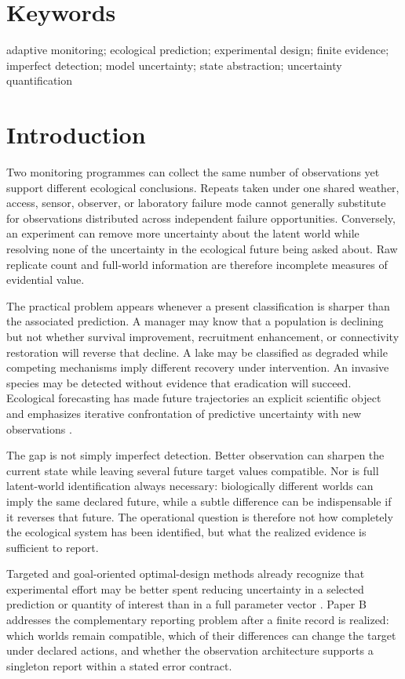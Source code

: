 \documentclass[11pt]{article}
\begin{document}
\section*{Keywords}
adaptive monitoring; ecological prediction; experimental design; finite evidence; imperfect detection; model uncertainty; state abstraction; uncertainty quantification

\section{Introduction}
Two monitoring programmes can collect the same number of observations yet support different ecological conclusions. Repeats taken under one shared weather, access, sensor, observer, or laboratory failure mode cannot generally substitute for observations distributed across independent failure opportunities. Conversely, an experiment can remove more uncertainty about the latent world while resolving none of the uncertainty in the ecological future being asked about. Raw replicate count and full-world information are therefore incomplete measures of evidential value.

The practical problem appears whenever a present classification is sharper than the associated prediction. A manager may know that a population is declining but not whether survival improvement, recruitment enhancement, or connectivity restoration will reverse that decline. A lake may be classified as degraded while competing mechanisms imply different recovery under intervention. An invasive species may be detected without evidence that eradication will succeed. Ecological forecasting has made future trajectories an explicit scientific object and emphasizes iterative confrontation of predictive uncertainty with new observations \cite{Dietze2017,DietzeEtAl2018}.

The gap is not simply imperfect detection. Better observation can sharpen the current state while leaving several future target values compatible. Nor is full latent-world identification always necessary: biologically different worlds can imply the same declared future, while a subtle difference can be indispensable if it reverses that future. The operational question is therefore not how completely the ecological system has been identified, but what the realized evidence is sufficient to report.

Targeted and goal-oriented optimal-design methods already recognize that experimental effort may be better spent reducing uncertainty in a selected prediction or quantity of interest than in a full parameter vector \cite{VanlierEtAl2012,AttiaEtAl2018,ZhongEtAl2026}. Paper B addresses the complementary reporting problem after a finite record is realized: which worlds remain compatible, which of their differences can change the target under declared actions, and whether the observation architecture supports a singleton report within a stated error contract.
\end{document}
